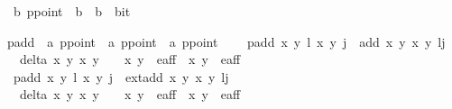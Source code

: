 %
	
\begin{isabellebody}%

\isamarkupfalse%
\ {\isacharparenleft}{\isacharprime}b{\isacharparenright}\ ppoint\ {\isacharequal}\ {\isacartoucheopen}{\isacharparenleft}{\isacharparenleft}{\isacharprime}b\ {\isasymtimes}\ {\isacharprime}b{\isacharparenright}\ {\isasymtimes}\ bit{\isacharparenright}{\isacartoucheclose}\isanewline

p{\isacharunderscore}add\ {\isacharcolon}{\isacharcolon}\ {\isacharprime}a\ ppoint\ {\isasymRightarrow}\ {\isacharprime}a\ ppoint\ {\isasymRightarrow}\ {\isacharprime}a\ ppoint\ \ \isanewline
\ \ p{\isacharunderscore}add\ {\isacharparenleft}{\isacharparenleft}x\ y\ l{\isacharparenright}\ {\isacharparenleft}{\isacharparenleft}x\ y\ j{\isacharparenright}\ {\isacharequal}\ {\isacharparenleft}add\ {\isacharparenleft}x\ y\ {\isacharparenleft}x\ y\ l{\isacharplus}j{\isacharparenright}\isanewline
\ \ delta\ x\ y\ x\ y\ {\isasymnoteq}\ {}\ {\isasymand}\ {\isacharparenleft}x\ y\ {\isasymin}\ e{\isacharprime}{\isacharunderscore}aff\ {\isasymand}\ {\isacharparenleft}x\ y\ {\isasymin}\ e{\isacharprime}{\isacharunderscore}aff\ \isanewline
{\isacharbar}\ p{\isacharunderscore}add\ {\isacharparenleft}{\isacharparenleft}x\ y\ l{\isacharparenright}\ {\isacharparenleft}{\isacharparenleft}x\ y\ j{\isacharparenright}\ {\isacharequal}\ {\isacharparenleft}ext{\isacharunderscore}add\ {\isacharparenleft}x\ y\ {\isacharparenleft}x\ y\ l{\isacharplus}j{\isacharparenright}\isanewline
\ \ delta{\isacharprime}\ x\ y\ x\ y\ {\isasymnoteq}\ {}\ {\isasymand}\ {\isacharparenleft}x\ y\ {\isasymin}\ e{\isacharprime}{\isacharunderscore}aff\ {\isasymand}\ {\isacharparenleft}x\ y\ {\isasymin}\ e{\isacharprime}{\isacharunderscore}aff


\end{isabellebody}

